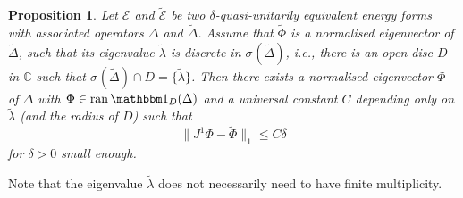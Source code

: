 \documentclass[12pt,reqno,a4paper]{amsart}            %
\numberwithin{equation}{section}
\theoremstyle{mythmstyle}       %
\newtheorem{proposition}[theorem]{Proposition}
\theoremstyle{mydefstyle}        %
\newcommand{\normsymb}{\|}
\newcommand{\norm}[2][{}]{\normsymb{#2}\normsymb_{{#1}}}    %
\DeclareMathOperator{\ran}    {ran}
\newcommand{\specsymb} {\sigma} %
\newcommand{\spec}[2][{}]   {\specsymb_{\mathrm{#1}}(#2)}
\newcommand{\C}{\mathbb{C}} %
\newcommand{\1}{\mathbbm 1}                    %
\newcommand{\wt}{\widetilde}           %
\newcommand{\energy}{\mathcal E}
\begin{document}
\begin{proposition}
  \label{prp:conv.ef}
  Let $\energy$ and $\wt {\energy}$ be two $\delta$-quasi-unitarily
  equivalent energy forms with associated operators $\Delta$ and $\wt
  \Delta$.  Assume that $\wt \Phi$ is a normalised eigenvector of $\wt
  \Delta$, such that its eigenvalue $\wt \lambda$ is discrete in
  $\spec {\wt \Delta}$, i.e., there is an open disc $D$ in $\C$ such
  that $\spec {\wt \Delta} \cap D=\{\wt \lambda\}$.  Then there exists
  a normalised eigenvector $\Phi$ of $\Delta$ with $\Phi \in \ran
  \1_D(\Delta)$ and a universal constant $C$ depending only on $\wt
  \lambda$ (and the radius of $D$) such that
  \begin{equation*}
    \norm[1]{J^1 \Phi - \wt \Phi} \le C\delta
  \end{equation*}
  for $\delta>0$ small enough.
\end{proposition}
Note that the eigenvalue $\wt \lambda$ does not necessarily need to
have finite multiplicity.
\end{document}
